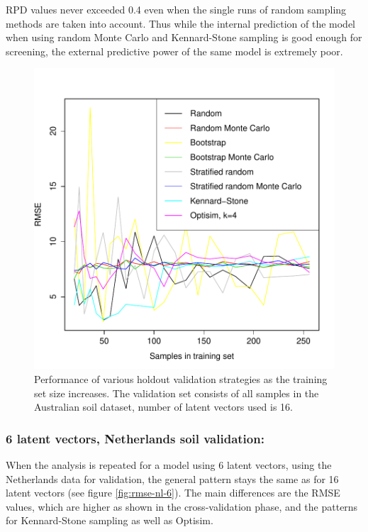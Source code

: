 \documentclass{isprs}
\begin{document}
RPD values never exceeded 0.4 even when the single runs of random sampling methods are taken into account. Thus while the internal prediction of the model when using random Monte Carlo and Kennard-Stone sampling is good enough for screening, the external predictive power of the same model is extremely poor.

\begin{figure}[ht!]
\includegraphics[width=1.0\columnwidth]{../script/output/rmse-au-16.pdf}
\begin{center}
    \caption{Performance of various holdout validation strategies as the training set size increases. The validation set consists of all samples in the Australian soil dataset, number of latent vectors used is 16.}
    \label{fig:rmse-au-16}
\end{center}
\end{figure}

\subsubsection{6 latent vectors, Netherlands soil validation:}\label{sec:NL6}

When the analysis is repeated for a model using 6 latent vectors, using the Netherlands data for validation, the general pattern stays the same as for 16 latent vectors (see figure \ref{fig:rmse-nl-6}). The main differences are the RMSE values, which are higher as shown in the cross-validation phase, and the patterns for Kennard-Stone sampling as well as Optisim.
\end{document}
